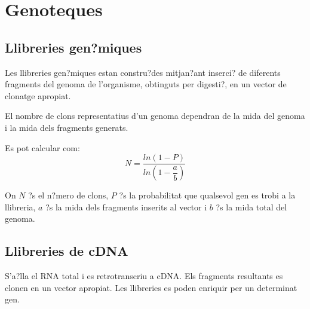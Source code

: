 
\section{Genoteques}
\label{sec:genoteques}

\subsection{Llibreries gen?miques}
\label{sec:llibr-genom}
Les llibreries gen?miques estan constru?des mitjan?ant inserci? de diferents fragments del genoma de l'organisme, obtinguts per digesti?, en un vector de clonatge apropiat.

El nombre de clons representatius d'un genoma dependran de la mida del genoma i la mida dels fragments generats.

Es pot calcular com:
\begin{equation}
  \label{eq:1}
  N = \frac{ln(1-P)}{ln(1-\dfrac{a}{b})}
\end{equation}

On $N$ ?s el n?mero de clons, $P$ ?s la probabilitat que qualsevol gen es trobi a la llibreria, $a$ ?s la mida dels fragments inserits al vector i $b$ ?s la mida total del genoma.

\subsection{Llibreries de cDNA}
\label{sec:llibreries-de-cdna}
S'a?lla el RNA total i es retrotranscriu a cDNA. Els fragments resultants es clonen en un vector apropiat. Les llibreries es poden enriquir per un determinat gen.

